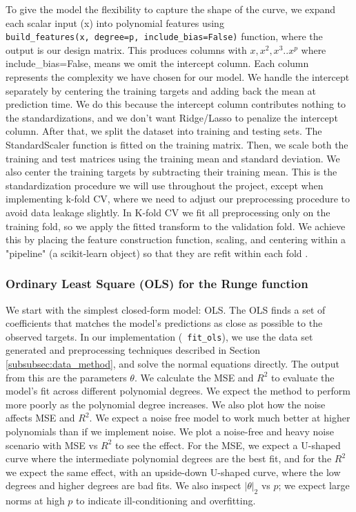 \documentclass[amssymb,twocolumn,aps,floatfix]{revtex4-2}
\begin{document}
To give the model the flexibility to capture the shape of the curve, we expand each scalar input (x) into polynomial features using \texttt{build\_features(x,\ degree=p,\ include\_bias=False)} function, where the output is our design matrix. This produces columns with $x, x^2, x^3 .. x^p$ where include\_bias=False, means we omit the intercept column. Each column represents the complexity we have chosen for our model. We handle the intercept separately by centering the training targets and adding back the mean at prediction time. We do this because the intercept column contributes nothing to the standardizations, and we don't want Ridge/Lasso to penalize the intercept column. After that, we split the dataset into training and testing sets. The StandardScaler function is fitted on the training matrix. Then, we scale both the training and test matrices using the training mean and standard deviation. We also center the training targets by subtracting their training mean. This is the standardization procedure we will use throughout the project, except when implementing k-fold CV, where we need to adjust our preprocessing procedure to avoid data leakage slightly. In K-fold CV we fit all preprocessing only on the training fold, so we apply the fitted transform to the validation fold. We achieve this by placing the feature construction function, scaling, and centering within a "pipeline" (a scikit-learn object) so that they are refit within each fold \cite{hjorthjensen_week35_misc} \cite{compfys39}. \\

\subsubsection{Ordinary Least Square (OLS) for the Runge function}
 \label{subsubsec:ols_method}

We start with the simplest closed-form model: OLS. The OLS finds a set of coefficients that matches the model's predictions as close as possible to the observed targets. In our implementation (\texttt{ fit\_ols}), we use the data set generated and preprocessing techniques described in Section \ref{subsubsec:data_method}, and solve the normal equations directly. The output from this are the parameters $\theta$. We calculate the MSE and $R^2$ to evaluate the model's fit across different polynomial degrees. We expect the method to perform more poorly as the polynomial degree increases. We also plot how the noise affects MSE and $R^2$. We expect a noise free model to work much better at higher polynomials than if we implement noise. We plot a noise-free and heavy noise scenario with MSE vs $R^2$ to see the effect. For the MSE, we expect a U-shaped curve where the intermediate polynomial degrees are the best fit, and for the $R^2$ we expect the same effect, with an upside-down U-shaped curve, where the low degrees and higher degrees are bad fits. We also inspect $|\theta|_2$ vs $p$; we expect large norms at high $p$ to indicate ill-conditioning and overfitting. \\
\end{document}
